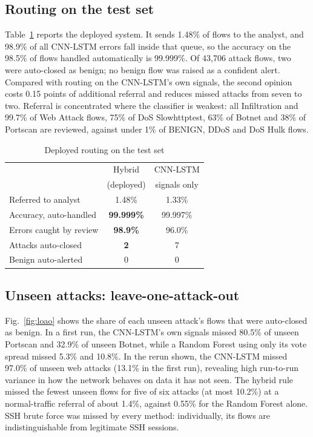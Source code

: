 \documentclass[conference]{IEEEtran}
\begin{document}
\subsection{Routing on the test set}
Table~\ref{tab:routing} reports the deployed system. It sends 1.48\% of flows to the analyst,
and 98.9\% of all CNN-LSTM errors fall inside that queue, so the accuracy on the 98.5\% of
flows handled automatically is 99.999\%. Of 43,706 attack flows, two were auto-closed as benign;
no benign flow was raised as a confident alert. Compared with routing on the CNN-LSTM's own
signals, the second opinion costs 0.15 points of additional referral and reduces missed attacks
from seven to two. Referral is concentrated where the classifier is weakest: all Infiltration and 99.7\% of Web
Attack flows, 75\% of DoS Slowhttptest, 63\% of Botnet and 38\% of Portscan are reviewed,
against under 1\% of BENIGN, DDoS and DoS Hulk flows.

\begin{table}[t]
\caption{Deployed routing on the test set}
\label{tab:routing}
\centering
\footnotesize
\begin{tabular}{lcc}
\toprule
 & Hybrid & CNN-LSTM \\
 & (deployed) & signals only \\
\midrule
Referred to analyst & 1.48\% & 1.33\% \\
Accuracy, auto-handled & \textbf{99.999\%} & 99.997\% \\
Errors caught by review & \textbf{98.9\%} & 96.0\% \\
Attacks auto-closed & \textbf{2} & 7 \\
Benign auto-alerted & 0 & 0 \\
\bottomrule
\end{tabular}
\end{table}

\subsection{Unseen attacks: leave-one-attack-out}
\label{sec:loao}
Fig.~\ref{fig:loao} shows the share of each unseen attack's flows that were auto-closed as benign.
In a first run, the CNN-LSTM's own signals missed 80.5\% of unseen Portscan and 32.9\% of unseen
Botnet, while a Random Forest using only its vote spread missed 5.3\% and 10.8\%. In the rerun
shown, the CNN-LSTM missed 97.0\% of unseen web attacks (13.1\% in the first run), revealing high
run-to-run variance in how the network behaves on data it has not seen. The hybrid rule missed
the fewest unseen flows for five of six attacks (at most 10.2\%) at a normal-traffic referral of
about 1.4\%, against 0.55\% for the Random Forest alone. SSH brute force was missed by every method:
individually, its flows are indistinguishable from legitimate SSH sessions.
\end{document}
